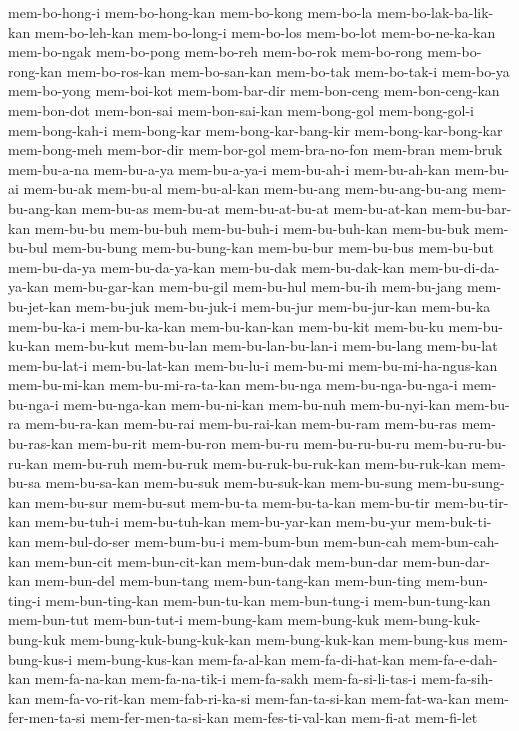 {mem-bo-hong-i mem-bo-hong-kan mem-bo-kong mem-bo-la mem-bo-lak-ba-lik-kan
mem-bo-leh-kan mem-bo-long-i mem-bo-los mem-bo-lot mem-bo-ne-ka-kan
mem-bo-ngak mem-bo-pong mem-bo-reh mem-bo-rok mem-bo-rong mem-bo-rong-kan
mem-bo-ros-kan mem-bo-san-kan mem-bo-tak mem-bo-tak-i mem-bo-ya
mem-bo-yong mem-boi-kot mem-bom-bar-dir mem-bon-ceng mem-bon-ceng-kan
mem-bon-dot mem-bon-sai mem-bon-sai-kan mem-bong-gol mem-bong-gol-i
mem-bong-kah-i mem-bong-kar mem-bong-kar-bang-kir mem-bong-kar-bong-kar
mem-bong-meh mem-bor-dir mem-bor-gol mem-bra-no-fon mem-bran mem-bruk
mem-bu-a-na mem-bu-a-ya mem-bu-a-ya-i mem-bu-ah-i mem-bu-ah-kan mem-bu-ai
mem-bu-ak mem-bu-al mem-bu-al-kan mem-bu-ang mem-bu-ang-bu-ang
mem-bu-ang-kan mem-bu-as mem-bu-at mem-bu-at-bu-at mem-bu-at-kan
mem-bu-bar-kan mem-bu-bu mem-bu-buh mem-bu-buh-i mem-bu-buh-kan mem-bu-buk
mem-bu-bul mem-bu-bung mem-bu-bung-kan mem-bu-bur mem-bu-bus mem-bu-but
mem-bu-da-ya mem-bu-da-ya-kan mem-bu-dak mem-bu-dak-kan
mem-bu-di-da-ya-kan mem-bu-gar-kan mem-bu-gil mem-bu-hul mem-bu-ih
mem-bu-jang mem-bu-jet-kan mem-bu-juk mem-bu-juk-i mem-bu-jur
mem-bu-jur-kan mem-bu-ka mem-bu-ka-i mem-bu-ka-kan mem-bu-kan-kan
mem-bu-kit mem-bu-ku mem-bu-ku-kan mem-bu-kut mem-bu-lan
mem-bu-lan-bu-lan-i mem-bu-lang mem-bu-lat mem-bu-lat-i mem-bu-lat-kan
mem-bu-lu-i mem-bu-mi mem-bu-mi-ha-ngus-kan mem-bu-mi-kan
mem-bu-mi-ra-ta-kan mem-bu-nga mem-bu-nga-bu-nga-i mem-bu-nga-i
mem-bu-nga-kan mem-bu-ni-kan mem-bu-nuh mem-bu-nyi-kan mem-bu-ra
mem-bu-ra-kan mem-bu-rai mem-bu-rai-kan mem-bu-ram mem-bu-ras
mem-bu-ras-kan mem-bu-rit mem-bu-ron mem-bu-ru mem-bu-ru-bu-ru
mem-bu-ru-bu-ru-kan mem-bu-ruh mem-bu-ruk mem-bu-ruk-bu-ruk-kan
mem-bu-ruk-kan mem-bu-sa mem-bu-sa-kan mem-bu-suk mem-bu-suk-kan
mem-bu-sung mem-bu-sung-kan mem-bu-sur mem-bu-sut mem-bu-ta mem-bu-ta-kan
mem-bu-tir mem-bu-tir-kan mem-bu-tuh-i mem-bu-tuh-kan mem-bu-yar-kan
mem-bu-yur mem-buk-ti-kan mem-bul-do-ser mem-bum-bu-i mem-bum-bun
mem-bun-cah mem-bun-cah-kan mem-bun-cit mem-bun-cit-kan mem-bun-dak
mem-bun-dar mem-bun-dar-kan mem-bun-del mem-bun-tang mem-bun-tang-kan
mem-bun-ting mem-bun-ting-i mem-bun-ting-kan mem-bun-tu-kan mem-bun-tung-i
mem-bun-tung-kan mem-bun-tut mem-bun-tut-i mem-bung-kam mem-bung-kuk
mem-bung-kuk-bung-kuk mem-bung-kuk-bung-kuk-kan mem-bung-kuk-kan
mem-bung-kus mem-bung-kus-i mem-bung-kus-kan mem-fa-al-kan
mem-fa-di-hat-kan mem-fa-e-dah-kan mem-fa-na-kan mem-fa-na-tik-i
mem-fa-sakh mem-fa-si-li-tas-i mem-fa-sih-kan mem-fa-vo-rit-kan
mem-fab-ri-ka-si mem-fan-ta-si-kan mem-fat-wa-kan mem-fer-men-ta-si
mem-fer-men-ta-si-kan mem-fes-ti-val-kan mem-fi-at mem-fi-let
}
